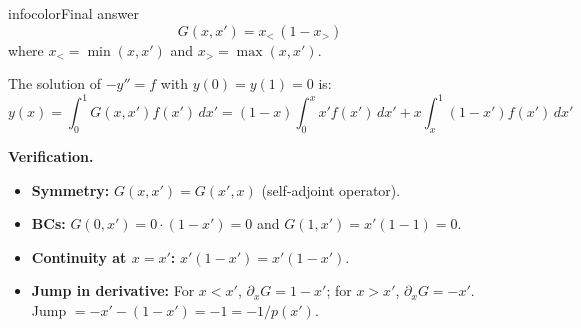 \documentclass[a4paper,11pt]{article} %
\newenvironment{summarybox}[1][]{\begin{custombox}[#1]{infocolor}{Final answer}}{\end{custombox}}
\begin{document}
\begin{summarybox}
$$G(x, x') = x_<\,(1 - x_>)$$
where $x_< = \min(x,x')$ and $x_> = \max(x,x')$.

The solution of $-y'' = f$ with $y(0)=y(1)=0$ is:
$$y(x) = \int_0^1 G(x, x') f(x')\,dx' = (1-x)\int_0^x x' f(x')\,dx' + x\int_x^1 (1-x') f(x')\,dx'$$
\end{summarybox}

\textbf{Verification.}
\begin{itemize}
    \item \textbf{Symmetry:} $G(x,x') = G(x',x)$ (self-adjoint operator). \checkmark
    \item \textbf{BCs:} $G(0,x') = 0 \cdot (1-x') = 0$ and $G(1,x') = x'(1-1) = 0$. \checkmark
    \item \textbf{Continuity at $x=x'$:} $x'(1-x') = x'(1-x')$. \checkmark
    \item \textbf{Jump in derivative:} For $x < x'$, $\partial_x G = 1-x'$; for $x > x'$, $\partial_x G = -x'$. Jump $= -x' - (1-x') = -1 = -1/p(x')$. \checkmark
\end{itemize}

\newpage
\end{document}
